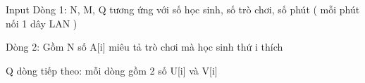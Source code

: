 Input
Dòng 1: N, M, Q tương ứng với số học sinh, số trò chơi, số phút ( mỗi phút nối 1 dây LAN )


Dòng 2: Gồm N số A[i] miêu tả trò chơi mà học sinh thứ i thích


Q dòng tiếp theo: mỗi dòng gồm 2 số U[i] và V[i]